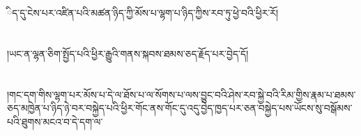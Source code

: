 ིད་དུ་ངེས་པར་འཛིན་པའི་མཚན་ཉིད་ཀྱི་མོས་པ་ལྷག་པ་ཉིད་ཀྱིས་རབ་ཏུ་ཕྱེ་བའི་ཕྱིར་རོ།\chapter{ }།ཡང་ན་ལྷན་ཅིག་སྤྱོད་པའི་ཕྱིར་རྒྱུའི་གནས་སྐབས་ཐམས་ཅད་རྗོད་པར་བྱེད་དོ།\chapter{ }།གང་དག་གིས་ལྷག་པར་མོས་པ་དེ་ལ་ཐོས་པ་ལ་སོགས་པ་ལས་བྱུང་བའི་ཤེས་རབ་སྐྱེ་བའི་རིམ་གྱིས་རྣམ་པ་ཐམས་ཅད་མཁྱེན་པ་ཉིད་ཉེ་བར་བསྐྱེད་པའི་ཕྱིར་གོང་ནས་གོང་དུ་འདུ་བྱེད་ཁྱད་པར་ཅན་བསྐྱེད་པས་ཡོངས་སུ་བསྒོམས་པའི་ཐུགས་མངའ་བ་དེ་དག་ལ་